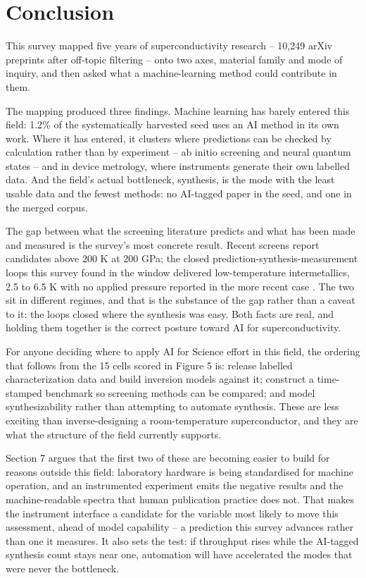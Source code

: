 \documentclass[
  11pt,
]{article}
\begin{document}
\section{Conclusion}\label{conclusion}

This survey mapped five years of superconductivity research -- 10,249
arXiv preprints after off-topic filtering -- onto two axes, material
family and mode of inquiry, and then asked what a machine-learning
method could contribute in them.

The mapping produced three findings. Machine learning has barely entered
this field: 1.2\% of the systematically harvested seed uses an AI method
in its own work. Where it has entered, it clusters where predictions can
be checked by calculation rather than by experiment -- ab initio
screening and neural quantum states -- and in device metrology, where
instruments generate their own labelled data. And the field's actual
bottleneck, synthesis, is the mode with the least usable data and the
fewest methods: no AI-tagged paper in the seed, and one in the merged
corpus.

The gap between what the screening literature predicts and what has been
made and measured is the survey's most concrete result. Recent screens
report candidates above 200 K at 200 GPa; the closed
prediction-synthesis-measurement loops this survey found in the window
delivered low-temperature intermetallics, 2.5 to 6.5 K with no applied
pressure reported in the more recent case
\citep{li2026agentic, pogue2022closed}. The two sit in different
regimes, and that is the substance of the gap rather than a caveat to
it: the loops closed where the synthesis was easy. Both facts are real,
and holding them together is the correct posture toward AI for
superconductivity.

For anyone deciding where to apply AI for Science effort in this field,
the ordering that follows from the 15 cells scored in Figure 5 is:
release labelled characterization data and build inversion models
against it; construct a time-stamped benchmark so screening methods can
be compared; and model synthesizability rather than attempting to
automate synthesis. These are less exciting than inverse-designing a
room-temperature superconductor, and they are what the structure of the
field currently supports.

Section 7 argues that the first two of these are becoming easier to
build for reasons outside this field: laboratory hardware is being
standardised for machine operation, and an instrumented experiment emits
the negative results and the machine-readable spectra that human
publication practice does not. That makes the instrument interface a
candidate for the variable most likely to move this assessment, ahead of
model capability -- a prediction this survey advances rather than one it
measures. It also sets the test: if throughput rises while the AI-tagged
synthesis count stays near one, automation will have accelerated the
modes that were never the bottleneck.
\end{document}

